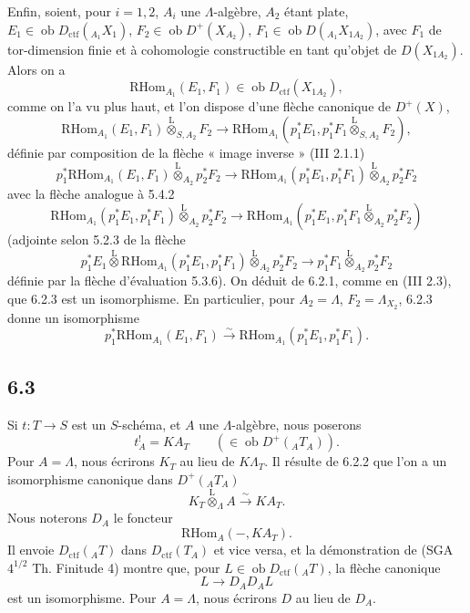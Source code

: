\documentclass[11pt]{article}
\providecommand{\RHom}{\mathrm{RHom}}
\providecommand{\lten}{\overset{\mathrm L}{\otimes}}
\providecommand{\Ob}{\operatorname{ob}}
\providecommand{\RHom}{\mathrm{RHom}}
\providecommand{\lten}{\overset{\mathrm L}{\otimes}}
\providecommand{\RHom}{\mathrm R\mathcal{H}om}
\providecommand{\lten}{\overset{\mathrm L}{\otimes}}
\providecommand{\Ob}{\operatorname{ob}}
\providecommand{\lten}{\overset{\mathrm L}{\otimes}}
\providecommand{\lten}{\overset{\mathrm L}{\otimes}}
\providecommand{\Ob}{\operatorname{Ob}}
\providecommand{\lten}{\overset{\mathrm L}{\otimes}}
\providecommand{\RHom}{\mathrm{RHom}}
\providecommand{\Ob}{\operatorname{ob}}
\providecommand{\Ob}{\operatorname{Ob}}
\providecommand{\lten}{\overset{\mathrm L}{\otimes}}
\begin{document}
Enfin, soient, pour $i=1,2$, $A_i$ une $\Lambda$-algèbre, $A_2$ étant plate, $E_1\in\Ob D_{\mathrm{ctf}}({}_{A_1}X_1)$, $F_2\in\Ob D^+(X_{A_2})$, $F_1\in\Ob D({}_{A_1}X_{1A_2})$, avec $F_1$ de tor-dimension finie et à cohomologie constructible en tant qu'objet de $D(X_{1A_2})$. Alors on a
\[
\RHom_{A_1}(E_1,F_1)\in\Ob D_{\mathrm{ctf}}(X_{1A_2}),
\]
comme on l'a vu plus haut, et l'on dispose d'une flèche canonique de $D^+(X)$,
\begin{equation}
\RHom_{A_1}(E_1,F_1)\lten_{S,A_2}F_2
\longrightarrow
\RHom_{A_1}(p_1^*E_1,p_1^*F_1\lten_{S,A_2}F_2),
\tag{6.2.3}
\end{equation}
définie par composition de la flèche « image inverse » (III 2.1.1)
\[
p_1^*\RHom_{A_1}(E_1,F_1)\lten_{A_2}p_2^*F_2
\longrightarrow
\RHom_{A_1}(p_1^*E_1,p_1^*F_1)\lten_{A_2}p_2^*F_2
\]
avec la flèche analogue à 5.4.2
\[
\RHom_{A_1}(p_1^*E_1,p_1^*F_1)\lten_{A_2}p_2^*F_2
\longrightarrow
\RHom_{A_1}(p_1^*E_1,p_1^*F_1\lten_{A_2}p_2^*F_2)
\]
(adjointe selon 5.2.3 de la flèche
\[
p_1^*E_1\lten\RHom_{A_1}(p_1^*E_1,p_1^*F_1)\lten_{A_2}p_2^*F_2
\longrightarrow
p_1^*F_1\lten_{A_2}p_2^*F_2
\]
définie par la flèche d'évaluation 5.3.6). On déduit de 6.2.1, comme en (III 2.3), que 6.2.3 est un isomorphisme. En particulier, pour $A_2=\Lambda$, $F_2=\Lambda_{X_2}$, 6.2.3 donne un isomorphisme
\begin{equation}
p_1^*\RHom_{A_1}(E_1,F_1)
\xrightarrow{\sim}
\RHom_{A_1}(p_1^*E_1,p_1^*F_1).
\tag{6.2.4}
\end{equation}

\subsection*{6.3}
Si $t:T\to S$ est un $S$-schéma, et $A$ une $\Lambda$-algèbre, nous poserons
\begin{equation}
t_A^! = KA_T \qquad(\in\Ob D^+({}_AT_A)).
\tag{6.3.1}
\end{equation}
Pour $A=\Lambda$, nous écrirons $K_T$ au lieu de $K\Lambda_T$. Il résulte de 6.2.2 que l'on a un isomorphisme canonique dans $D^+({}_AT_A)$
\begin{equation}
K_T\lten_{\Lambda}A\xrightarrow{\sim}KA_T.
\tag{6.3.2}
\end{equation}
Nous noterons $D_A$ le foncteur
\[
\RHom_A(-,KA_T).
\]
Il envoie $D_{\mathrm{ctf}}({}_AT)$ dans $D_{\mathrm{ctf}}(T_A)$ et vice versa, et la démonstration de (SGA $4^{1/2}$ Th. Finitude 4) montre que, pour $L\in\Ob D_{\mathrm{ctf}}({}_AT)$, la flèche canonique
\[
L\longrightarrow D_AD_AL
\]
est un isomorphisme. Pour $A=\Lambda$, nous écrirons $D$ au lieu de $D_A$.
\end{document}
